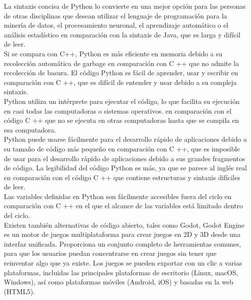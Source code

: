 \documentclass[12pt,letterpaper]{article}
\begin{document}
La sintaxis concisa de Python lo convierte en una mejor opción para las personas de otras disciplinas que desean utilizar el lenguaje de programación para la minería de datos, el procesamiento neuronal, el aprendizaje automático o el análisis estadístico en comparación con la sintaxis de Java, que es larga y difícil de leer.
\vspace{5mm}\\
\indent Si se compara con C++, Python es más eficiente en memoria debido a su recolección automática de garbage en comparación con C ++ que no admite la recolección de basura.
El código Python es fácil de aprender, usar y escribir en comparación con C ++, que es difícil de entender y usar debido a su compleja sintaxis.\vspace{5mm}\\
\indent Python utiliza un intérprete para ejecutar el código, lo que facilita su ejecución en casi todas las computadoras o sistemas operativos. en comparación con el código C ++ que no se ejecuta en otras computadoras hasta que se compila en esa computadora.\vspace{5mm}\\
\indent Python puede usarse fácilmente para el desarrollo rápido de aplicaciones debido a su tamaño de código más pequeño en comparación con C ++, que es imposible de usar para el desarrollo rápido de aplicaciones debido a sus grandes fragmentos de código.
La legibilidad del código Python es más, ya que se parece al inglés real en comparación con el código C ++ que contiene estructuras y sintaxis difíciles de leer. \vspace{5mm}\\
\indent Las variables definidas en Python son fácilmente accesibles fuera del ciclo en comparación con C ++ en el que el alcance de las variables está limitado dentro del ciclo. \vspace{5mm}\\
\indent Existen también alternativas de código abierto, tales como Godot, Godot Engine es un motor de juegos multiplataforma para crear juegos en 2D y 3D desde una interfaz unificada. Proporciona un conjunto completo de herramientas comunes, para que los usuarios puedan concentrarse en crear juegos sin tener que reinventar algo que ya existe. Los juegos se pueden exportar con un clic a varias plataformas, incluidas las principales plataformas de escritorio (Linux, macOS, Windows), así como plataformas móviles (Android, iOS) y basadas en la web (HTML5).
\vspace{5mm}\\
\end{document}
